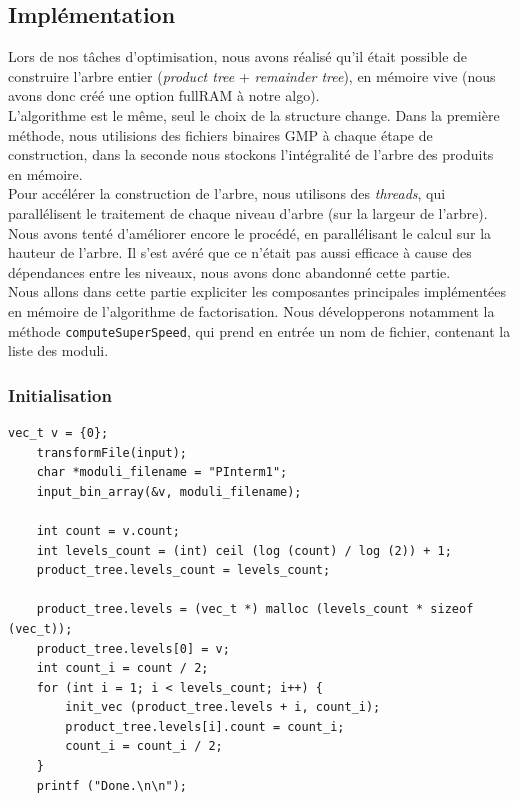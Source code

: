 \subsection{Implémentation}


Lors de nos tâches d'optimisation, nous avons réalisé qu'il était possible de construire l'arbre entier (\textit{product tree} + \textit{remainder tree}), en mémoire vive (nous avons donc créé une option fullRAM à notre algo).\\


L'algorithme est le même, seul le choix de la structure change.
Dans la première méthode, nous utilisions des fichiers binaires GMP à chaque étape de construction, dans la  seconde nous stockons l'intégralité de l'arbre des produits en mémoire.\\


Pour accélérer la construction de l'arbre, nous utilisons des \textit{threads}, qui parallélisent le traitement de chaque niveau d'arbre (sur la largeur de l'arbre).
Nous avons tenté d'améliorer encore le procédé, en parallélisant le calcul sur la hauteur de l'arbre. Il s'est avéré que ce n'était pas aussi efficace à cause des dépendances entre les niveaux, nous avons donc abandonné cette partie.\\


Nous allons dans cette partie expliciter les composantes principales implémentées en mémoire de l'algorithme de factorisation.  Nous développerons notamment la méthode \texttt{computeSuperSpeed}, qui prend en entrée un nom de fichier, contenant la liste des moduli. 


\subsubsection{Initialisation}

\begin{lstlisting}[style=customc,caption=fact\_superspeed.c - partie 1, label=fact1]
	vec_t v = {0};
	transformFile(input);
	char *moduli_filename = "PInterm1";
	input_bin_array(&v, moduli_filename);
	
	int count = v.count;
	int levels_count = (int) ceil (log (count) / log (2)) + 1;
	product_tree.levels_count = levels_count;
	
	product_tree.levels = (vec_t *) malloc (levels_count * sizeof (vec_t));
	product_tree.levels[0] = v;
	int count_i = count / 2;
	for (int i = 1; i < levels_count; i++) {
		init_vec (product_tree.levels + i, count_i);
		product_tree.levels[i].count = count_i;
		count_i = count_i / 2;
	}
	printf ("Done.\n\n");
\end{lstlisting}

